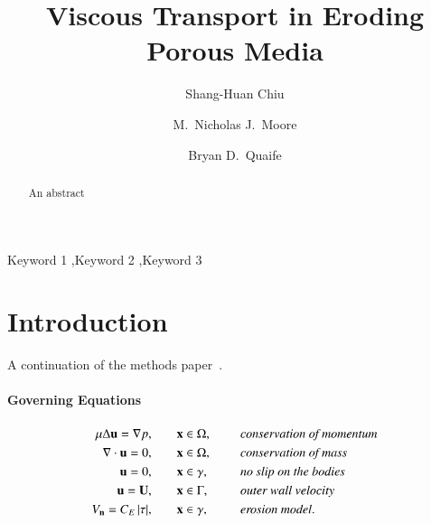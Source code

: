 \documentclass[preprint, 10pt]{elsarticle}
\begin{document}
\title{Viscous Transport in Eroding Porous Media}



\author[SH]{Shang-Huan Chiu}
\author[Nick]{M.~Nicholas J.~Moore}
\author[Bryan]{Bryan D.~Quaife}

\address[SH]{Department of Scientific Computing, Florida State
University, Tallahassee, FL, 32306.}
\address[Nick]{Department of Mathematics and Geophysical Fluid Dynamics Institute, Florida State University, Tallahassee, FL, 32306.}
\address[Bryan]{Department of Scientific Computing and Geophysical Fluid Dynamics Institute, Florida State University, Tallahassee, FL, 32306.}

\begin{abstract} 
  An abstract
\end{abstract}

\begin{keyword}
  Keyword 1 \sep Keyword 2 \sep Keyword 3 
\end{keyword}

\maketitle

\section{Introduction}
\label{s:intro}
A continuation of the methods paper~\cite{qua-moo2018}.
\paragraph{Governing Equations}
\begin{equation}
\label{eqn:erosionModel}
\begin{split}
  \mu \Delta {\mathbf{u}} = {\nabla} p, &\hspace{20pt} {\mathbf{x}} \in \Omega, \hspace*{.2in} &&\mbox{\em conservation
of momentum}\\
{\nabla} \cdot {\mathbf{u}} = 0, &\hspace{20pt} {\mathbf{x}} \in \Omega, \hspace*{.2in} &&\mbox{\em conservation of mass} \\
{\mathbf{u}} = 0, &\hspace{20pt} {\mathbf{x}} \in \gamma, \hspace*{.2in} &&\mbox{\em no slip on the
bodies} \\
{\mathbf{u}} = {\mathbf{U}}, &\hspace{20pt} {\mathbf{x}} \in \Gamma, \hspace*{.2in} &&\mbox{\em outer wall
velocity} \\
V_{\mathbf{n}} = C_E \, \lvert \tau \rvert, &\hspace{20pt} {\mathbf{x}} \in \gamma,
&&\mbox{\em erosion model}.
\end{split}
\end{equation}
\end{document}
